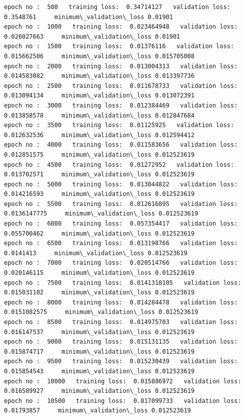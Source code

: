 \documentclass[11pt, a4paper , landscape]{article}
\begin{document}
    \begin{Verbatim}[commandchars=\\\{\}]
epoch no :  500   training loss:  0.34714127   validation loss:  0.3548761     minimum\_validation\_loss 0.01901
epoch no :  1000   training loss:  0.023464948   validation loss:  0.026027663     minimum\_validation\_loss 0.01901
epoch no :  1500   training loss:  0.01376116   validation loss:  0.015662506     minimum\_validation\_loss 0.015705008
epoch no :  2000   training loss:  0.013004313   validation loss:  0.014583082     minimum\_validation\_loss 0.013397736
epoch no :  2500   training loss:  0.011678733   validation loss:  0.013094134     minimum\_validation\_loss 0.013072391
epoch no :  3000   training loss:  0.012384469   validation loss:  0.013858578     minimum\_validation\_loss 0.012847684
epoch no :  3500   training loss:  0.01125925   validation loss:  0.012632536     minimum\_validation\_loss 0.012594412
epoch no :  4000   training loss:  0.011583656   validation loss:  0.012851575     minimum\_validation\_loss 0.012523619
epoch no :  4500   training loss:  0.01272952   validation loss:  0.013702571     minimum\_validation\_loss 0.012523619
epoch no :  5000   training loss:  0.013044822   validation loss:  0.014216593     minimum\_validation\_loss 0.012523619
epoch no :  5500   training loss:  0.012616895   validation loss:  0.0136147775     minimum\_validation\_loss 0.012523619
epoch no :  6000   training loss:  0.057354417   validation loss:  0.055700462     minimum\_validation\_loss 0.012523619
epoch no :  6500   training loss:  0.013198766   validation loss:  0.0141413     minimum\_validation\_loss 0.012523619
epoch no :  7000   training loss:  0.020514766   validation loss:  0.020146115     minimum\_validation\_loss 0.012523619
epoch no :  7500   training loss:  0.0141318105   validation loss:  0.015031102     minimum\_validation\_loss 0.012523619
epoch no :  8000   training loss:  0.014284478   validation loss:  0.0151082575     minimum\_validation\_loss 0.012523619
epoch no :  8500   training loss:  0.014975703   validation loss:  0.016147537     minimum\_validation\_loss 0.012523619
epoch no :  9000   training loss:  0.015131135   validation loss:  0.015874717     minimum\_validation\_loss 0.012523619
epoch no :  9500   training loss:  0.015230439   validation loss:  0.015854543     minimum\_validation\_loss 0.012523619
epoch no :  10000   training loss:  0.015886972   validation loss:  0.016589927     minimum\_validation\_loss 0.012523619
epoch no :  10500   training loss:  0.017099733   validation loss:  0.01793857     minimum\_validation\_loss 0.012523619

\end{Verbatim}
\end{document}
